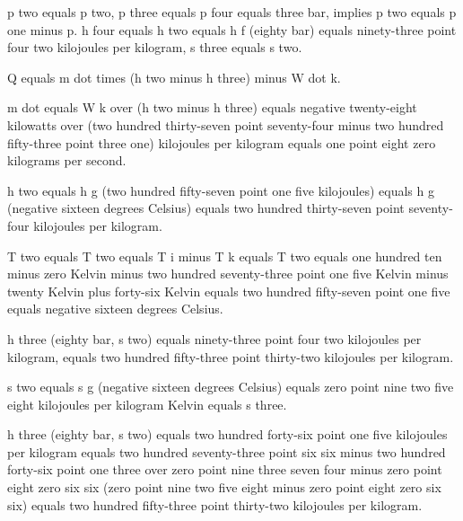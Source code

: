 p two equals p two, p three equals p four equals three bar, implies p two equals p one minus p. h four equals h two equals h f (eighty bar) equals ninety-three point four two kilojoules per kilogram, s three equals s two. 

Q equals m dot times (h two minus h three) minus W dot k. 

m dot equals W k over (h two minus h three) equals negative twenty-eight kilowatts over (two hundred thirty-seven point seventy-four minus two hundred fifty-three point three one) kilojoules per kilogram equals one point eight zero kilograms per second. 

h two equals h g (two hundred fifty-seven point one five kilojoules) equals h g (negative sixteen degrees Celsius) equals two hundred thirty-seven point seventy-four kilojoules per kilogram. 

T two equals T two equals T i minus T k equals T two equals one hundred ten minus zero Kelvin minus two hundred seventy-three point one five Kelvin minus twenty Kelvin plus forty-six Kelvin equals two hundred fifty-seven point one five equals negative sixteen degrees Celsius. 

h three (eighty bar, s two) equals ninety-three point four two kilojoules per kilogram, equals two hundred fifty-three point thirty-two kilojoules per kilogram. 

s two equals s g (negative sixteen degrees Celsius) equals zero point nine two five eight kilojoules per kilogram Kelvin equals s three. 

h three (eighty bar, s two) equals two hundred forty-six point one five kilojoules per kilogram equals two hundred seventy-three point six six minus two hundred forty-six point one three over zero point nine three seven four minus zero point eight zero six six (zero point nine two five eight minus zero point eight zero six six) equals two hundred fifty-three point thirty-two kilojoules per kilogram.